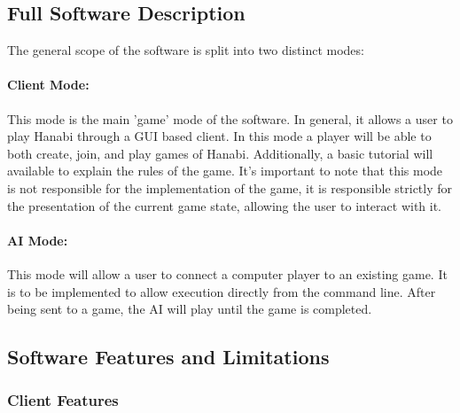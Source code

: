 \documentclass[12pt]{article}
\begin{document}
\subsection{Full Software Description}

The general scope of the software is split into two distinct modes:

\paragraph{Client Mode:} This mode is the main 'game' mode of the software. In general,
it allows a user to play Hanabi through a GUI based client.  
In this mode a player will be able to both create, join, and play games
of Hanabi.  Additionally, a basic tutorial will available to explain the rules of the game.
It's important to note that this mode
is not responsible for the implementation of the game, it is responsible strictly for
the presentation of the current game state, allowing the user to interact with it.

\paragraph{AI Mode:} This mode will allow a user to connect a computer player
to an existing game. It is to be implemented to allow execution directly from the command
line. After being sent to a game, the AI will play until the game is completed.

\subsection{Software Features and Limitations}

\subsubsection{Client Features}
\end{document}
